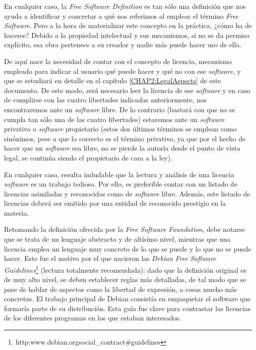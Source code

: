 En cualquier caso, la \textit{Free Software Definition} es tan sólo una
definición que nos ayuda a identificar y concretar a qué nos referimos al
emplear el término \textit{Free Software}. Pero a la hora de materializar este
concepto en la práctica, ¿cómo ha de hacerse? Debido a la propiedad intelectual
y sus mecanismos, si no se da permiso explícito, esa obra pertenece a su creador
y nadie más puede hacer uso de ella.

De aquí nace la necesidad de contar con el concepto de licencia, mecanismo
empleado para indicar al usuario qué puede hacer y qué no con ese
\textit{software}, y que se estudiará en detalle en el capítulo
\ref{CHAP2:LegalAspects} de este documento. De este modo, será necesario
leer la licencia de ese \textit{software} y en caso de cumplirse con las cuatro
libertades indicadas anteriormente, nos encontraremos ante un \textit{software}
libre. De lo contrario (bastará con que no se cumpla tan sólo una de las cuatro
libertades) estaremos ante un \textit{software} privativo o \textit{software}
propietario (estos dos últimos términos se emplean como sinónimos, pese a que lo
correcto es el término privativo, ya que por el hecho de hacer que un
\textit{software} sea libre, no se pierde la autoría desde el punto de vista
legal, se continúa siendo el propietario de cara a la ley).

En cualquier caso, resulta indudable que la lectura y análisis de una licencia
\textit{software} es un trabajo tedioso. Por ello, es preferible contar con un
listado de licencias asimiladas y reconocidas como de \textit{software} libre.
Además, este listado de licencias deberá ser emitido por una entidad de
reconocido prestigio en la materia.

Retomando la definición ofrecida por la \textit{Free Software Foundation}, debe
notarse que se trata de un lenguaje abstracto y de altísimo nivel, mientras que
una licencia emplea un lenguaje muy concreto de lo que se puede y lo que no se
puede hacer. Este fue el motivo por el que nacieron las \textit{Debian Free
Software Guidelines}\footnote{
http:\/\/www.debian.org\/social\_contract\#guidelines } (lectura totalmente
recomendada): dado que la definición original es de muy alto nivel, se deben
establecer reglas más detalladas, de tal modo que se pase de hablar de aspectos
como la libertad de expresión, a cosas mucho más concretas.
El trabajo principal de Debian consistía en empaquetar el software que formaría parte de su distribución. Esta guía fue clave para contrastar las licencias de los diferentes programas en los que estaban interesados.

